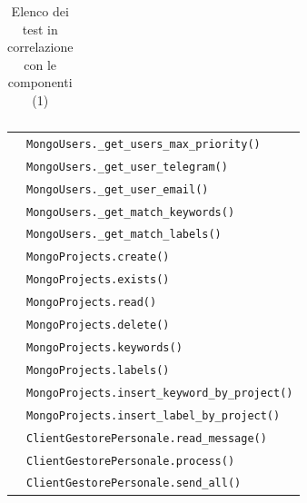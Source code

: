 \begin{table}[H]
{\begin{tabularx}{0.6\textwidth}{cX}
				\bottomrule
			\end{tabularx}}
			\caption{Elenco dei test in correlazione con le componenti (1)}
		\end{table}


		\begin{table}[H]
			\centering
			{\def\arraystretch{1.4}
            \begin{tabularx}{0.65\textwidth}{cX}
				\addtotu & \texttt{MongoUsers.\_get\_users\_max\_priority()} \\
				\addtotu & \texttt{MongoUsers.\_get\_user\_telegram()} \\
				\addtotu & \texttt{MongoUsers.\_get\_user\_email()} \\
				\addtotu & \texttt{MongoUsers.\_get\_match\_keywords()} \\
				\addtotu & \texttt{MongoUsers.\_get\_match\_labels()} \\

				\addtotu & \texttt{MongoProjects.create()} \\
				\addtotu & \texttt{MongoProjects.exists()} \\
				\addtotu & \texttt{MongoProjects.read()} \\
				\addtotu & \texttt{MongoProjects.delete()} \\
				\addtotu & \texttt{MongoProjects.keywords()} \\
				\addtotu & \texttt{MongoProjects.labels()} \\
				\addtotu & \texttt{MongoProjects.insert\_keyword\_by\_project()} \\
				\addtotu & \texttt{MongoProjects.insert\_label\_by\_project()} \\

				\addtotu & \texttt{ClientGestorePersonale.read\_message()} \\
				\addtotu & \texttt{ClientGestorePersonale.process()} \\
				\addtotu & \texttt{ClientGestorePersonale.send\_all()} \\


\end{tabularx}}
\end{table}
